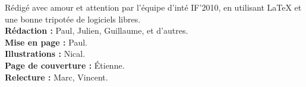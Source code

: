 

\tableofcontents
\begin{multicols}{2}
{
    \begin{center}
\footnotesize
Rédigé avec amour et attention par l'équipe d'inté IF'2010, en utilisant
\LaTeX{} et une bonne tripotée de logiciels libres. \\
\textbf{Rédaction : }Paul, Julien, Guillaume, et d'autres.\\
\textbf{Mise en page : }Paul.\\
\textbf{Illustrations :} Nical.\\
\textbf{Page de couverture :} Étienne.\\
\textbf{Relecture :} Marc, Vincent.\\
\normalsize
\cc \ccby \ccnc \ccsa
\end{center}
}
\end{multicols}

